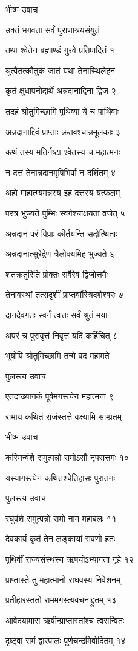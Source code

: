 

भीष्म उवाच

उक्तं भगवता सर्वं पुराणाश्रयसंयुतं

तथा श्वेतेन ब्रह्माण्डं गुरवे प्रतिपादितं १

श्रुत्वैतत्कौतुकं जातं यथा तेनास्थिलेहनं

कृतं क्षुधापनोदार्थे अन्नदानाद्विना द्विज २

तदहं श्रोतुमिच्छामि पृथिव्यां ये च पार्थिवाः

अन्नदानाद्दिवं प्राप्ताः क्रतवश्चान्नमूलकाः ३

कथं तस्य मतिर्नष्टा श्वेतस्य च महात्मनः

न दत्तं तेनान्नदानमृषिभिर्वा न दर्शितम् ४

अहो माहात्म्यमन्नस्य इह दत्तस्य यत्फलम्

परत्र भुज्यते पुम्भिः स्वर्गश्चाक्षयतां व्रजेत् ५

अन्नदानं परं विप्राः कीर्तयन्ति सदोत्थिताः

अन्नदानात्सुरेद्रेण त्रैलोक्यमिह भुज्यते ६

शतक्रतुरिति प्रोक्तः सर्वैरेव द्विजोत्तमैः

तेनावस्थां तत्सदृशीं प्राप्तवांस्त्रिदशेश्वरः ७

दानदेवगतः स्वर्गं त्वत्तः सर्वं श्रुतं मया

अपरं च पुरावृत्तं निवृत्तं यदि कर्हिचित् ८

भूयोपि श्रोतुमिच्छामि तन्मे वद महामते

पुलस्त्य उवाच

एतदाख्यानकं पूर्वमगस्त्येन महात्मना ९

रामाय कथितं राजंस्तत्ते वक्ष्यामि साम्प्रतम्

भीष्म उवाच

कस्मिन्वंशे समुत्पन्नो रामोऽसौ नृपसत्तमः १०

यस्यागस्त्येन कथितश्चेतिहासः पुरातनः

पुलस्त्य उवाच

रघुवंशे समुत्पन्नो रामो नाम महाबलः ११

देवकार्यं कृतं तेन लङ्कायां रावणो हतः

पृथिवीं राज्यसंस्थस्य ऋषयोऽभ्यागता गृहे १२

प्राप्तास्ते तु महात्मानो राघवस्य निवेशनम्

प्रतीहारस्ततो राममगस्त्यवचनाद्द्रुतम् १३

आवेदयामास ऋषीन्प्राप्तास्तांश्च त्वरान्वितः

दृष्ट्वा रामं द्वारपालः पूर्णचन्द्रमिवोदितम् १४

